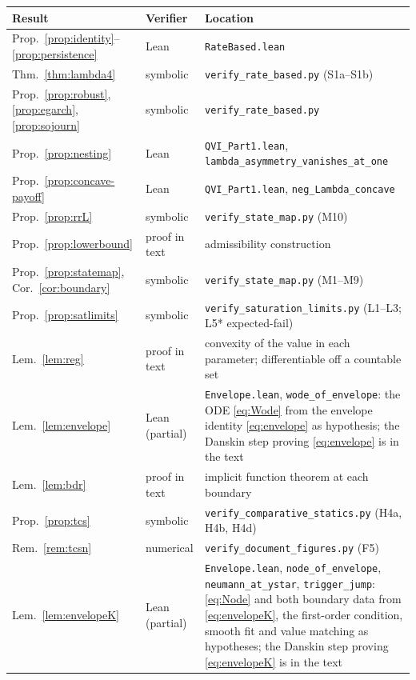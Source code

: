 \documentclass[11pt]{article}
\theoremstyle{remark}
\begin{document}
\begin{longtable}{p{} p{} p{}}
\toprule
\textbf{Result} & \textbf{Verifier} & \textbf{Location} \\
\midrule
\endhead
Prop.~\ref{prop:identity}--\ref{prop:persistence} & Lean &
\texttt{RateBased.lean} \\
Thm.~\ref{thm:lambda4} & symbolic &
\texttt{verify\_rate\_based.py} (S1a--S1b) \\
Prop.~\ref{prop:robust}, \ref{prop:egarch}, \ref{prop:sojourn} &
symbolic & \texttt{verify\_rate\_based.py} \\
Prop.~\ref{prop:nesting} & Lean &
\texttt{QVI\_Part1.lean}, \texttt{lambda\_asymmetry\_vanishes\_at\_one} \\
Prop.~\ref{prop:concave-payoff} & Lean &
\texttt{QVI\_Part1.lean}, \texttt{neg\_Lambda\_concave} \\
Prop.~\ref{prop:rrL} & symbolic & \texttt{verify\_state\_map.py} (M10) \\
Prop.~\ref{prop:lowerbound} & proof in text &
admissibility construction \\
Prop.~\ref{prop:statemap}, Cor.~\ref{cor:boundary} & symbolic &
\texttt{verify\_state\_map.py} (M1--M9) \\
Prop.~\ref{prop:satlimits} & symbolic &
\texttt{verify\_saturation\_limits.py} (L1--L3; L5* expected-fail) \\
Lem.~\ref{lem:reg} & proof in text &
convexity of the value in each parameter; differentiable off a countable
set \\
Lem.~\ref{lem:envelope} & Lean (partial) &
\texttt{Envelope.lean}, \texttt{wode\_of\_envelope}: the ODE
\eqref{eq:Wode} from the envelope identity \eqref{eq:envelope} as
hypothesis; the Danskin step proving \eqref{eq:envelope} is in the text \\
Lem.~\ref{lem:bdr} & proof in text &
implicit function theorem at each boundary \\
Prop.~\ref{prop:tcs} & symbolic &
\texttt{verify\_comparative\_statics.py} (H4a, H4b, H4d) \\
Rem.~\ref{rem:tcsn} & numerical &
\texttt{verify\_document\_figures.py} (F5) \\
Lem.~\ref{lem:envelopeK} & Lean (partial) &
\texttt{Envelope.lean}, \texttt{node\_of\_envelope},
\texttt{neumann\_at\_ystar}, \texttt{trigger\_jump}: \eqref{eq:Node}
and both boundary data from \eqref{eq:envelopeK}, the first-order
condition, smooth fit and value matching as hypotheses; the Danskin step
proving \eqref{eq:envelopeK} is in the text \\

\end{longtable}
\end{document}
